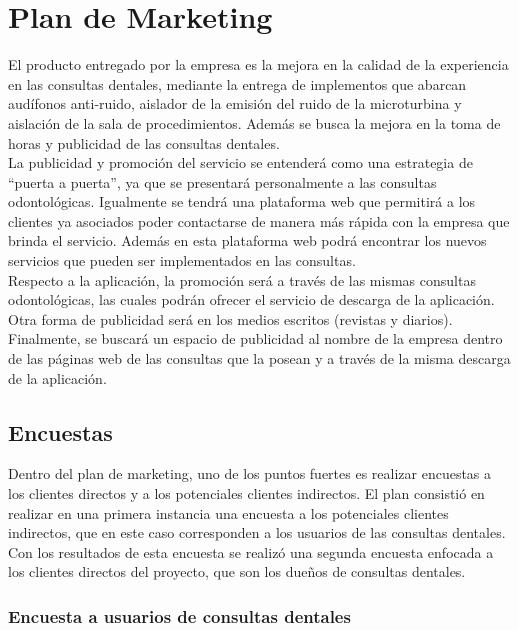 \documentclass[letterpaper,12pt]{article}
\begin{document}
\newpage
\section{Plan de Marketing}

El producto entregado por la empresa es la mejora en la calidad de la experiencia en las
consultas dentales, mediante la entrega de implementos que abarcan audífonos anti-ruido, aislador 
de la emisión del ruido de la microturbina y aislación de la sala de procedimientos. Además se busca 
la mejora en la toma de horas y publicidad de las consultas dentales.
\\[0.5cm]
\indent La publicidad y promoción del servicio se entenderá como una estrategia de “puerta a 
puerta”, ya que se presentará personalmente a las consultas odontológicas. Igualmente se tendrá 
una plataforma web que permitirá a los clientes ya asociados poder contactarse de manera más 
rápida con la empresa que brinda el servicio. Además en esta plataforma web podrá encontrar los 
nuevos servicios que pueden ser implementados en las consultas. 
\\[0.5cm]
\indent Respecto a la aplicación, la promoción será a través de las mismas consultas odontológicas, 
las cuales podrán ofrecer el servicio de descarga de la aplicación. Otra forma de publicidad será en 
los medios escritos (revistas y diarios).
\\[0.5cm]
\indent Finalmente, se buscará un espacio de publicidad al nombre de la empresa dentro de las 
páginas web de las consultas que la posean y a través de la misma descarga de la aplicación.

	\subsection{Encuestas}

Dentro del plan de marketing, uno de los puntos fuertes es realizar encuestas a los clientes
directos y a los potenciales clientes indirectos. El plan consistió en realizar en una primera instancia una encuesta a los potenciales clientes indirectos, que en este caso corresponden a los usuarios de las consultas dentales. Con los resultados de esta encuesta se realizó una segunda encuesta enfocada a los clientes directos del proyecto, que son los dueños de consultas dentales.
		\subsubsection{Encuesta a usuarios de consultas dentales}
\end{document}
